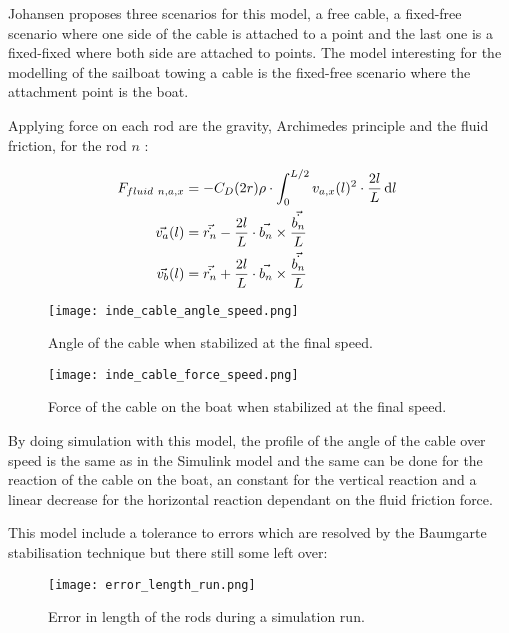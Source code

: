 Johansen proposes three scenarios for this model, a free cable, a fixed-free scenario where one side of the cable is attached to a point and the last one is a fixed-fixed where both side are attached to points.
The model interesting for the modelling of the sailboat towing a cable is the fixed-free scenario where the attachment point is the boat.

Applying force on each rod are the gravity, Archimedes principle and the fluid friction, for the rod $n$ :

{
\begin{align}
\centering
F_{fluid~n,a,x} &= -C_D (2 r ) \rho \cdot \displaystyle \int_{0}^{L/2} v_{a,x}(l)^2 \cdot \frac{2l}{L} \, \mathrm{d}l\ \nonumber \\
\vec{v_{a}}(l) &= \vec{\dot{r_n}} - \frac{2 l}{L} \cdot \vec{b_n} \times \frac{\vec{\dot{b_n}}}{L} \nonumber \\
\vec{v_{b}}(l) &= \vec{\dot{r_n}} + \frac{2 l}{L} \cdot \vec{b_n} \times \frac{\vec{\dot{b_n}}}{L}
\end{align}
}



\begin{figure}[H]
\centering
    \begin{minipage}[b]{0.4\textwidth}
    \centering
    \texttt{[image: inde\_cable\_angle\_speed.png]}
    \caption{Angle of the cable when stabilized at the final speed.}
    \label{fig:angleIndSpeed}
    \end{minipage}
    \hfill
    \begin{minipage}[b]{0.45\textwidth}
    \centering
    \texttt{[image: inde\_cable\_force\_speed.png]}
    \caption{Force of the cable on the boat when stabilized at the final speed.}
    \label{fig:forceIndSpeed}
    \end{minipage}
\end{figure}

By doing simulation with this model, the profile of the angle of the cable over speed is the same as in the Simulink model and the same can be done for the reaction of the cable on the boat, an constant for the vertical reaction and a linear decrease for the horizontal reaction dependant on the fluid friction force.

This model include a tolerance to errors which are resolved by the Baumgarte stabilisation technique but 
there still some left over:


\begin{figure}[H]
\centering
    \texttt{[image: error\_length\_run.png]}
    \caption{Error in length of the rods during a simulation run.}
    \label{fig:errorLRod}
\end{figure}

